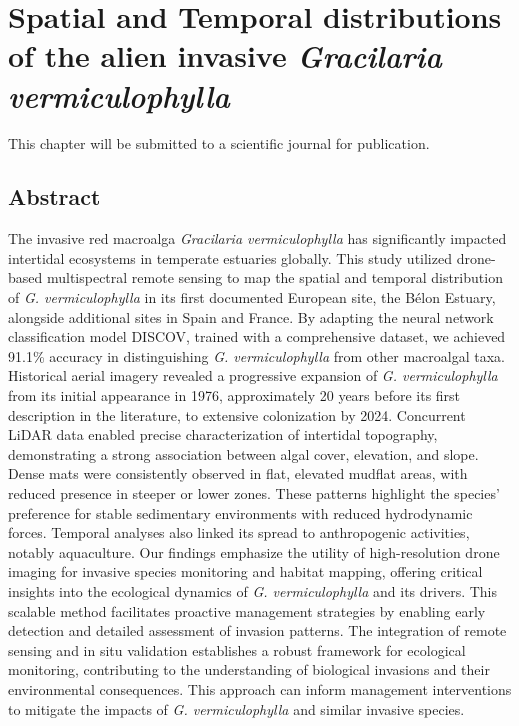 \documentclass[
  letterpaper,
  11pt,
  english,
  singlespacing,
  headsepline]{MastersDoctoralThesis}
\begin{document}
\newpage\null\thispagestyle{empty}\newpage


\chapter{\texorpdfstring{Spatial and Temporal distributions of the alien
invasive \emph{Gracilaria
vermiculophylla}}{Spatial and Temporal distributions of the alien invasive Gracilaria vermiculophylla}}\label{spatial-and-temporal-distributions-of-the-alien-invasive-gracilaria-vermiculophylla}

This chapter will be submitted to a scientific journal for publication.

\vspace{0.5cm}

\section*{Abstract}\label{abstract-2}


The invasive red macroalga \emph{Gracilaria vermiculophylla} has
significantly impacted intertidal ecosystems in temperate estuaries
globally. This study utilized drone-based multispectral remote sensing
to map the spatial and temporal distribution of \emph{G.
vermiculophylla} in its first documented European site, the Bélon
Estuary, alongside additional sites in Spain and France. By adapting the
neural network classification model DISCOV, trained with a comprehensive
dataset, we achieved 91.1\% accuracy in distinguishing \emph{G.
vermiculophylla} from other macroalgal taxa. Historical aerial imagery
revealed a progressive expansion of \emph{G. vermiculophylla} from its
initial appearance in 1976, approximately 20 years before its first
description in the literature, to extensive colonization by 2024.
Concurrent LiDAR data enabled precise characterization of intertidal
topography, demonstrating a strong association between algal cover,
elevation, and slope. Dense mats were consistently observed in flat,
elevated mudflat areas, with reduced presence in steeper or lower zones.
These patterns highlight the species' preference for stable sedimentary
environments with reduced hydrodynamic forces. Temporal analyses also
linked its spread to anthropogenic activities, notably aquaculture. Our
findings emphasize the utility of high-resolution drone imaging for
invasive species monitoring and habitat mapping, offering critical
insights into the ecological dynamics of \emph{G. vermiculophylla} and
its drivers. This scalable method facilitates proactive management
strategies by enabling early detection and detailed assessment of
invasion patterns. The integration of remote sensing and in situ
validation establishes a robust framework for ecological monitoring,
contributing to the understanding of biological invasions and their
environmental consequences. This approach can inform management
interventions to mitigate the impacts of \emph{G. vermiculophylla} and
similar invasive species.
\end{document}
